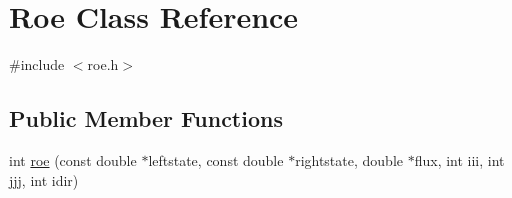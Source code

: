 \hypertarget{classRoe}{}\section{Roe Class Reference}
\label{classRoe}


{\ttfamily \#include $<$roe.\+h$>$}

\subsection*{Public Member Functions}
\begin{DoxyCompactItemize}
\item 
int \hyperlink{classRoe_aabc9084b5c735d7bdfdc88f3c7cfdc87}{roe} (const double $\ast$leftstate, const double $\ast$rightstate, double $\ast$flux, int iii, int jjj, int idir)
\end{DoxyCompactItemize}
